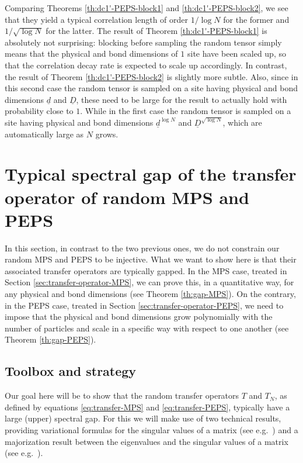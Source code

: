 \documentclass{amsart}
\begin{document}
Comparing Theorems \ref{th:dc1'-PEPS-block1} and \ref{th:dc1'-PEPS-block2}, we see that they yield a typical correlation length of order $1/\log N$ for the former and $1/\sqrt{\log N}$ for the latter. The result of Theorem \ref{th:dc1'-PEPS-block1} is absolutely not surprising: blocking before sampling the random tensor simply means that the physical and bond dimensions of $1$ site have been scaled up, so that the correlation decay rate is expected to scale up accordingly. In contrast, the result of Theorem \ref{th:dc1'-PEPS-block2} is slightly more subtle. Also, since in this second case the random tensor is sampled on a site having physical and bond dimensions $\underline{d}$ and $\underline{D}$, these need to be large for the result to actually hold with probability close to $1$. While in the first case the random tensor is sampled on a site having physical and bond dimensions $\underline{d}^{\log N}$ and $\underline{D}^{\sqrt{\log N}}$, which are automatically large as $N$ grows.


\section{Typical spectral gap of the transfer operator of random MPS and PEPS}
\label{sec:transfer-operator}

In this section, in contrast to the two previous ones, we do not constrain our random MPS and PEPS to be injective. What we want to show here is that their associated transfer operators are typically gapped. In the MPS case, treated in Section \ref{sec:transfer-operator-MPS}, we can prove this, in a quantitative way, for any physical and bond dimensions (see Theorem \ref{th:gap-MPS}). On the contrary, in the PEPS case, treated in Section \ref{sec:transfer-operator-PEPS}, we need to impose that the physical and bond dimensions grow polynomially with the number of particles and scale in a specific way with respect to one another (see Theorem \ref{th:gap-PEPS}).

\subsection{Toolbox and strategy} \hfill\par\smallskip

Our goal here will be to show that the random transfer operators $T$ and $T_N$, as defined by equations \eqref{eq:transfer-MPS} and \eqref{eq:transfer-PEPS}, typically have a large (upper) spectral gap. For this we will make use of two technical results, providing variational formulas for the singular values of a matrix (see e.g.~\cite[Problem III.6.1]{Bha}) and a majorization result between the eigenvalues and the singular values of a matrix (see e.g.~\cite[Theorem II.3.6]{Bha}).
\end{document}
